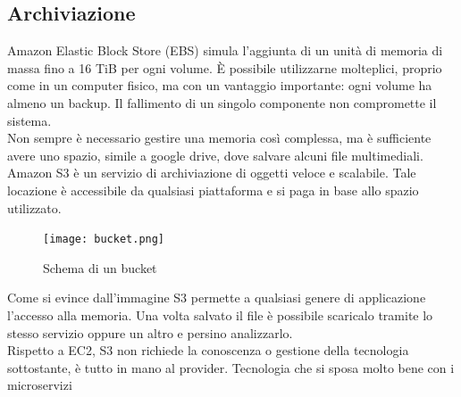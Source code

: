 \documentclass[12pt]{article}
\begin{document}
\subsection{Archiviazione}
Amazon Elastic Block Store (EBS) simula l'aggiunta di un unità di memoria di 
massa fino a 16 TiB per ogni volume. 
È possibile utilizzarne molteplici, proprio come in un computer fisico, ma con 
un vantaggio importante: ogni volume ha almeno un backup. 
Il fallimento di un singolo componente non compromette il sistema.
\\ Non sempre è necessario gestire una memoria così complessa, ma è sufficiente 
avere uno spazio, simile a google drive, dove salvare alcuni file multimediali.
Amazon S3 è un servizio di archiviazione di oggetti veloce e scalabile. 
Tale locazione è accessibile da qualsiasi piattaforma e si paga in base allo 
spazio utilizzato.
\begin{figure}[H]
\texttt{[image: bucket.png]}
\centering
\caption{Schema di un bucket}
\end{figure}
Come si evince dall'immagine S3 permette a qualsiasi genere di applicazione 
l'accesso alla memoria. 
Una volta salvato il file è possibile scaricalo tramite lo stesso servizio 
oppure un altro e persino analizzarlo.
\\ Rispetto a EC2, S3 non richiede la conoscenza o gestione della tecnologia 
sottostante, è tutto in mano al provider.
Tecnologia che si sposa molto bene con i microservizi
\end{document}

